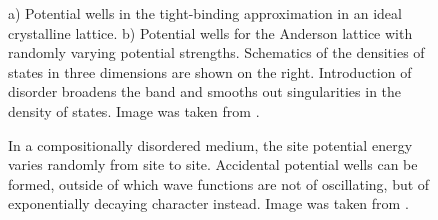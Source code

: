 \documentclass[10pt,a4paper]{article}
\begin{document}
\begin{minipage}[t]{0.42\textwidth} 
\begin{figure}[H]
\caption{a) Potential wells in the tight-binding approximation in an ideal crystalline lattice. b) Potential wells for the Anderson lattice with randomly varying potential strengths. Schematics of the densities of states in three dimensions are shown on the right. Introduction of disorder broadens the band and smooths out singularities in the density of states. Image was taken from \cite{Mott}.  }
\label{fig:band_structure} 
\end{figure}
\begin{figure}[H]
\caption{In a compositionally disordered medium, the site potential energy varies randomly from site to site. Accidental potential wells can be formed, outside of which wave functions are not of oscillating, but of exponentially decaying character instead. Image was taken from \cite{Kramer}.}
\label{fig:accidental_wells} 
\end{figure}
\end{minipage}\break
\end{document}

